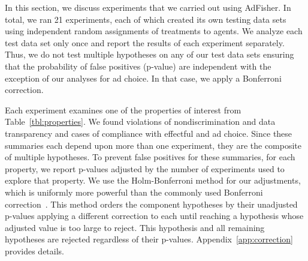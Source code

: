 \documentclass{article}
\begin{document}
In this section, we discuss experiments that we carried out using AdFisher.  
In total, we ran 21 experiments, each of which created its own testing data sets using independent random assignments of treatments to agents.  We analyze each test data set only once and report the results of each experiment separately. Thus, we do not test multiple hypotheses on any of our test data sets ensuring that the probability of false positives (p-value) are independent with the exception of our analyses for ad choice.  In that case, we apply a Bonferroni correction.

Each experiment examines one of the properties of interest from Table~\ref{tbl:properties}. We found violations of nondiscrimination and data transparency and cases of compliance with effectful and ad choice.
Since these summaries each depend upon more than one experiment, they are the composite of multiple hypotheses.  
To prevent false positives for these summaries, for each property, we report p-values adjusted by the number of experiments used to explore that property.  We use the Holm-Bonferroni method for our adjustments, which is uniformly more powerful than the commonly used Bonferroni correction~\cite{holm79scandinavian}.  This method orders the component hypotheses by their unadjusted p-values applying a different correction to each until reaching a hypothesis whose adjusted value is too large to reject.  This hypothesis and all remaining hypotheses are rejected regardless of their p-values.  Appendix~\ref{app:correction} provides details.
\end{document}
